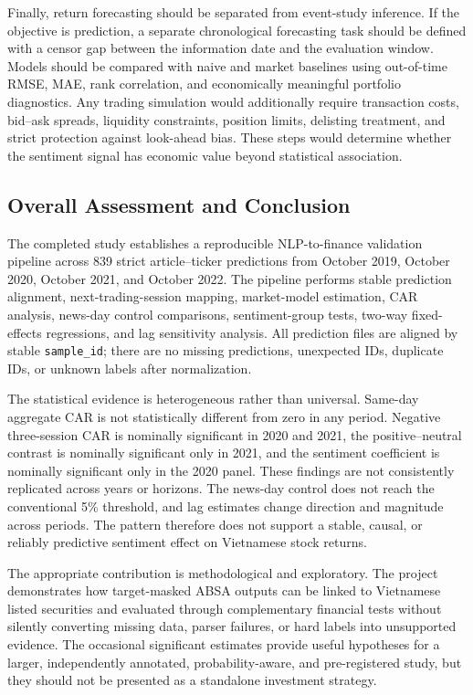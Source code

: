 \documentclass[12pt,a4paper]{article}
\begin{document}
Finally, return forecasting should be separated from event-study inference. If the objective is prediction, a separate chronological forecasting task should be defined with a censor gap between the information date and the evaluation window. Models should be compared with naive and market baselines using out-of-time RMSE, MAE, rank correlation, and economically meaningful portfolio diagnostics. Any trading simulation would additionally require transaction costs, bid--ask spreads, liquidity constraints, position limits, delisting treatment, and strict protection against look-ahead bias. These steps would determine whether the sentiment signal has economic value beyond statistical association.

\subsection{Overall Assessment and Conclusion}
\label{subsec:conclusion-statistical}

The completed study establishes a reproducible NLP-to-finance validation pipeline across 839 strict article--ticker predictions from October 2019, October 2020, October 2021, and October 2022. The pipeline performs stable prediction alignment, next-trading-session mapping, market-model estimation, CAR analysis, news-day control comparisons, sentiment-group tests, two-way fixed-effects regressions, and lag sensitivity analysis. All prediction files are aligned by stable \texttt{sample\_id}; there are no missing predictions, unexpected IDs, duplicate IDs, or unknown labels after normalization.

The statistical evidence is heterogeneous rather than universal. Same-day aggregate CAR is not statistically different from zero in any period. Negative three-session CAR is nominally significant in 2020 and 2021, the positive--neutral contrast is nominally significant only in 2021, and the sentiment coefficient is nominally significant only in the 2020 panel. These findings are not consistently replicated across years or horizons. The news-day control does not reach the conventional 5\% threshold, and lag estimates change direction and magnitude across periods. The pattern therefore does not support a stable, causal, or reliably predictive sentiment effect on Vietnamese stock returns.

The appropriate contribution is methodological and exploratory. The project demonstrates how target-masked ABSA outputs can be linked to Vietnamese listed securities and evaluated through complementary financial tests without silently converting missing data, parser failures, or hard labels into unsupported evidence. The occasional significant estimates provide useful hypotheses for a larger, independently annotated, probability-aware, and pre-registered study, but they should not be presented as a standalone investment strategy.
\end{document}
